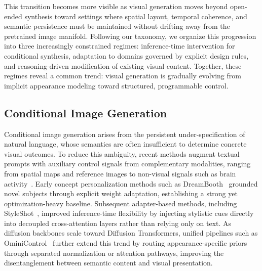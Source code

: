 \documentclass{llmxive}
\begin{document}
This transition becomes more visible as visual generation moves beyond open-ended synthesis toward settings where spatial layout, temporal coherence, and semantic persistence must be maintained without drifting away from the pretrained image manifold. Following our taxonomy, we organize this progression into three increasingly constrained regimes: inference-time intervention for conditional synthesis, adaptation to domains governed by explicit design rules, and reasoning-driven modification of existing visual content. Together, these regimes reveal a common trend: visual generation is gradually evolving from implicit appearance modeling toward structured, programmable control.



\subsection{Conditional Image Generation}
\label{subsec:conditional_gen}

Conditional image generation arises from the persistent under-specification of natural language, whose semantics are often insufficient to determine concrete visual outcomes. To reduce this ambiguity, recent methods augment textual prompts with auxiliary control signals from complementary modalities, ranging from spatial maps and reference images to non-visual signals such as brain activity~\citep{wang2024mindbridge}. Early concept personalization methods such as DreamBooth~\citep{ruiz2023dreambooth} grounded novel subjects through explicit weight adaptation, establishing a strong yet optimization-heavy baseline. Subsequent adapter-based methods, including StyleShot~\citep{StyleShot}, improved inference-time flexibility by injecting stylistic cues directly into decoupled cross-attention layers rather than relying only on text. As diffusion backbones scale toward Diffusion Transformers, unified pipelines such as OminiControl~\citep{OminiControl} further extend this trend by routing appearance-specific priors through separated normalization or attention pathways, improving the disentanglement between semantic content and visual presentation.
\end{document}

